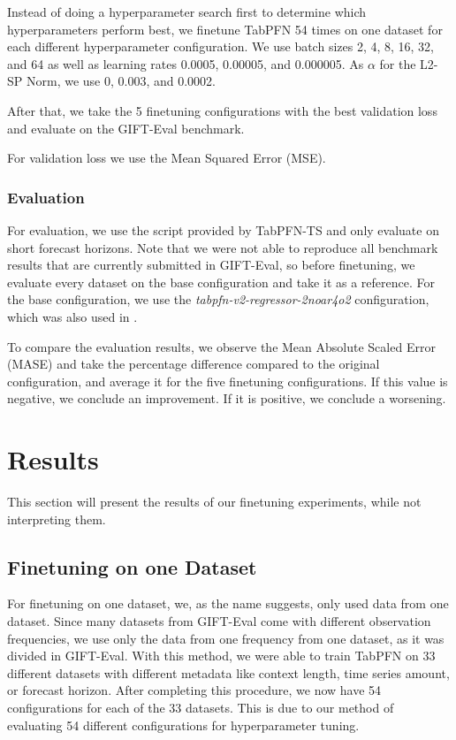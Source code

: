 Instead of doing a hyperparameter search first to determine which hyperparameters perform best, we finetune TabPFN 54 times on one dataset for each different hyperparameter configuration.
We use batch sizes 2, 4, 8, 16, 32, and 64 as well as learning rates 0.0005, 0.00005, and 0.000005.
As $\alpha$ for the L2-SP Norm, we use 0, 0.003, and 0.0002.

After that, we take the 5 finetuning configurations with the best validation loss and evaluate on the GIFT-Eval benchmark.

For validation loss we use the Mean Squared Error (MSE).
\subsubsection{Evaluation}
For evaluation, we use the script provided by TabPFN-TS and only evaluate on short forecast horizons.
Note that we were not able to reproduce all benchmark results that are currently submitted in GIFT-Eval, so before finetuning, we evaluate every dataset on the base configuration and take it as a reference.
For the base configuration, we use the \textit{tabpfn-v2-regressor-2noar4o2} configuration, which was also used in \citet{hoo2025tables}.

To compare the evaluation results, we observe the Mean Absolute Scaled Error (MASE) and take the percentage difference compared to the original configuration, and average it for the five finetuning configurations.
If this value is negative, we conclude an improvement.
If it is positive, we conclude a worsening.
\section{Results}
\label{sec:results_finetuning}
This section will present the results of our finetuning experiments, while not interpreting them. %
\subsection{Finetuning on one Dataset}
\label{subsec:singlefinetuning}
For finetuning on one dataset, we, as the name suggests, only used data from one dataset.
Since many datasets from GIFT-Eval come with different observation frequencies, we use only the data from one frequency from one dataset, as it was divided in GIFT-Eval.
With this method, we were able to train TabPFN on 33 different datasets with different metadata like context length, time series amount, or forecast horizon.
After completing this procedure, we now have 54 configurations for each of the 33 datasets.
This is due to our method of evaluating 54 different configurations for hyperparameter tuning.

